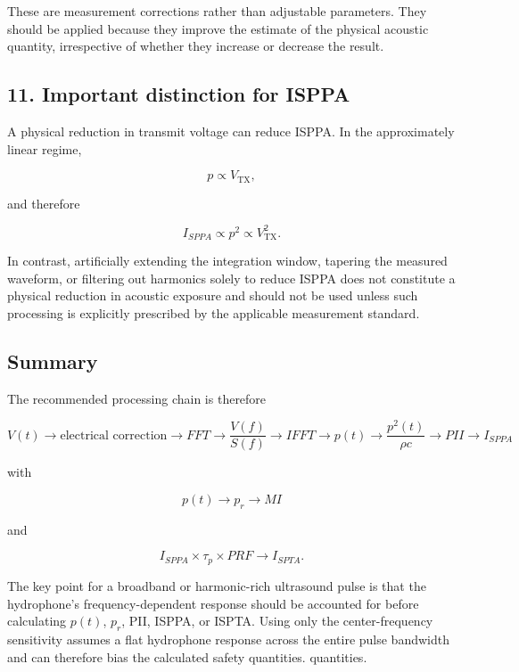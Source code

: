 \documentclass[11pt,a4paper]{article}
\begin{document}
These are measurement corrections rather than adjustable parameters. They
should be applied because they improve the estimate of the physical
acoustic quantity, irrespective of whether they increase or decrease the
result.

\subsection*{11. Important distinction for ISPPA}

A physical reduction in transmit voltage can reduce ISPPA. In the
approximately linear regime,

\[
p\propto V_{\mathrm{TX}},
\]

and therefore

\[
\boxed{
I_{SPPA}\propto p^2\propto V_{\mathrm{TX}}^2.
}
\]

In contrast, artificially extending the integration window, tapering the
measured waveform, or filtering out harmonics solely to reduce ISPPA does
not constitute a physical reduction in acoustic exposure and should not be
used unless such processing is explicitly prescribed by the applicable
measurement standard.

\subsection*{Summary}

The recommended processing chain is therefore

\[
\boxed{
V(t)
\rightarrow
\text{electrical correction}
\rightarrow
FFT
\rightarrow
\frac{V(f)}{S(f)}
\rightarrow
IFFT
\rightarrow
p(t)
\rightarrow
\frac{p^2(t)}{\rho c}
\rightarrow
PII
\rightarrow
I_{SPPA}
}
\]

with

\[
\boxed{
p(t)\rightarrow p_r\rightarrow MI
}
\]

and

\[
\boxed{
I_{SPPA}\times\tau_p\times PRF
\rightarrow
I_{SPTA}.
}
\]

The key point for a broadband or harmonic-rich ultrasound pulse is that the
hydrophone's frequency-dependent response should be accounted for before
calculating \(p(t)\), \(p_r\), PII, ISPPA, or ISPTA. Using only the
center-frequency sensitivity assumes a flat hydrophone response across the
entire pulse bandwidth and can therefore bias the calculated safety
quantities.
quantities.
\end{document}
